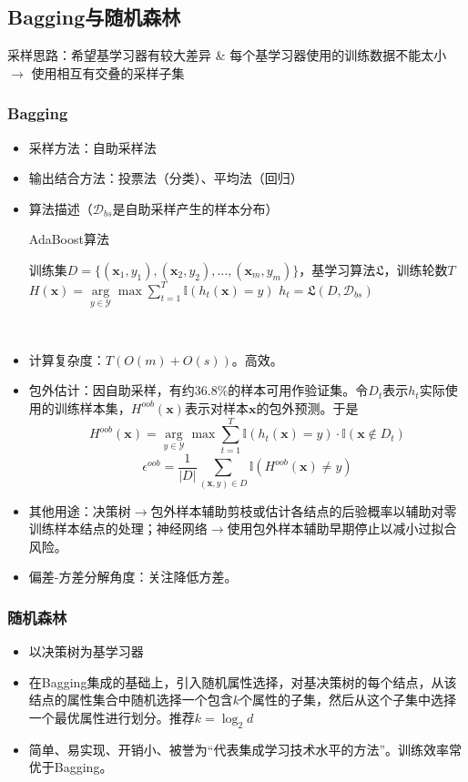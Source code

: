 \documentclass{ctexart}
\begin{document}
				\subsection{Bagging与随机森林}
					 
					 采样思路：希望基学习器有较大差异 \& 每个基学习器使用的训练数据不能太小 $\rightarrow$ 使用相互有交叠的采样子集
					 
					 \subsubsection{Bagging}
					 	\begin{itemize}
					 		\item 采样方法：自助采样法
					 		\item 输出结合方法：投票法（分类）、平均法（回归）
					 		\item 算法描述（$\mathcal{D}_{bs}$是自助采样产生的样本分布）\begin{algorithm}
					 			\caption{AdaBoost算法}
					 			\begin{algorithmic}[1]
					 				\REQUIRE 训练集$D=\{(\bm{x}_1,y_1),(\bm{x}_2,y_2),\dots,(\bm{x}_m,y_m)\}$，基学习算法$\mathfrak{L}$，训练轮数$T$
					 				\ENSURE $H(\bm{x})=\arg\limits_{y\in\mathcal{Y}}\max\sum_{t=1}^{T}\mathbb{I}(h_t(\bm{x})=y)$
					 					\STATE $h_t=\mathfrak{L}(D,\mathcal{D}_{bs})$\\
					 				\ENDFOR
					 			\end{algorithmic} 
					 		\end{algorithm}
				 			\item 计算复杂度：$T(O(m)+O(s))$。高效。
				 			\item 包外估计：因自助采样，有约36.8\%的样本可用作验证集。令$D_t$表示$h_t$实际使用的训练样本集，$H^{oob}(\bm{x})$表示对样本$\bm{x}$的包外预测。于是\[H^{oob}(\bm{x})=\arg\limits_{y\in\mathcal{Y}}\max\sum_{t=1}^{T}\mathbb{I}(h_t(\bm{x})=y)\cdot\mathbb{I}(\bm{x}\notin D_t)\]\[\epsilon^{oob}=\frac{1}{|D|}\sum_{(\bm{x},y)\in D}^{}\mathbb{I}(H^{oob}(\bm{x})\neq y)\]
				 			\item 其他用途：决策树$\rightarrow$包外样本辅助剪枝或估计各结点的后验概率以辅助对零训练样本结点的处理；神经网络$\rightarrow$使用包外样本辅助早期停止以减小过拟合风险。
				 			\item 偏差-方差分解角度：关注降低方差。
					 	\end{itemize}
				 	\subsubsection{随机森林}
				 		\begin{itemize}
				 			\item 以决策树为基学习器
				 			\item 在Bagging集成的基础上，引入随机属性选择，对基决策树的每个结点，从该结点的属性集合中随机选择一个包含$k$个属性的子集，然后从这个子集中选择一个最优属性进行划分。推荐$k=\log_2d$
				 			\item 简单、易实现、开销小、被誉为``代表集成学习技术水平的方法''。训练效率常优于Bagging。
				 		\end{itemize}
\end{document}
